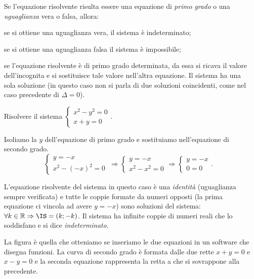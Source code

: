 Se l'equazione risolvente risulta essere una equazione di \emph{primo grado} o una \emph{uguaglianza} vera o falsa, allora:
\begin{itemize*}
\item se si ottiene una uguaglianza vera, il sistema è indeterminato;
\item se si ottiene una uguaglianza falsa il sistema è impossibile;
\item se l'equazione risolvente è di primo grado determinata, da essa si ricava il valore dell'incognita e si sostituisce tale valore nell'altra equazione. Il sistema ha una sola soluzione (in questo caso non si parla di due soluzioni coincidenti, come nel caso precedente di $\Delta =0$).
\end{itemize*}
\begin{exrig}
\begin{esempio}
Risolvere il sistema $\left\{\begin{array}{l}x^2-y^2=0\\x+y=0\end{array}\right.$.

Isoliamo la $y$ dell'equazione di primo grado e sostituiamo nell'equazione di secondo grado. 
\[\left\{\begin{array}{l}y=-x \\
x^2-(-x)^2=0\end{array}\right.\ 
\Rightarrow\left\{\begin{array}{l}y=-x \\
x^2-x^2=0\end{array}\right. 
\Rightarrow\left\{\begin{array}{l}y=-x\\
0=0\end{array}\right..\]

L'equazione risolvente del sistema in questo caso è una \emph{identità} (uguaglianza sempre verificata) e tutte le coppie formate da numeri opposti (la prima equazione ci vincola ad avere $y=-x$) sono soluzioni del sistema: $\forall k\in \mathbb{R}\Rightarrow \IS=(k;-k)$. Il sistema ha infinite coppie di numeri reali che lo soddisfano e si dice \emph{indeterminato}.
\begin{multicols}{2}
La figura è quella che otteniamo se inseriamo le due equazioni in un software che disegna funzioni. La curva di secondo grado è formata dalle due rette $x+y=0$ e $x-y=0$ e la seconda equazione rappresenta la retta a che si sovrappone alla precedente.
\begin{center}

\end{center}
\end{multicols}
\end{esempio}


\end{exrig}
